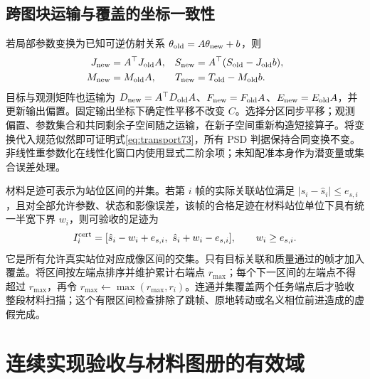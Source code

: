 \documentclass[UTF8,fontset=fandol,zihao=5,a4paper]{ctexart}
\theoremstyle{definition}
\theoremstyle{remark}\newtheorem{remark}[theorem]{说明}
\numberwithin{equation}{section}
\begin{document}
\subsection{跨图块运输与覆盖的坐标一致性}
若局部参数变换为已知可逆仿射关系 $\theta_{\rm old}=A\theta_{\rm new}+b$，则
\begin{align}
J_{\rm new}&=A^\top J_{\rm old}A,&
S_{\rm new}&=A^\top(S_{\rm old}-J_{\rm old}b),\\
M_{\rm new}&=M_{\rm old}A,&
T_{\rm new}&=T_{\rm old}-M_{\rm old}b.
\label{eq:transport73}
\end{align}
目标与观测矩阵也运输为 $D_{\rm new}=A^\top D_{\rm old}A$、$F_{\rm new}=F_{\rm old}A$、$E_{\rm new}=E_{\rm old}A$，并更新输出偏置。固定输出坐标下确定性平移不改变 $C$。选择分区同步平移；观测偏置、参数集合和共同剩余子空间随之运输，在新子空间重新构造短接算子。将变换代入规范似然即可证明式\eqref{eq:transport73}，所有 PSD 判据保持合同变换不变。非线性重参数化在线性化窗口内使用显式二阶余项；未知配准本身作为潜变量或集合误差处理。

材料足迹可表示为站位区间的并集。若第 $i$ 帧的实际关联站位满足 $|s_i-\hat s_i|\le e_{s,i}$，且对全部允许参数、状态和影像误差，该帧的合格足迹在材料站位单位下具有统一半宽下界 $w_i$，则可验收的足迹为
\begin{equation}
I_i^{\rm cert}=[\hat s_i-w_i+e_{s,i},\ \hat s_i+w_i-e_{s,i}],
\qquad w_i\ge e_{s,i}.
\label{eq:footprint73}
\end{equation}
它是所有允许真实站位对应成像区间的交集。只有目标关联和质量通过的帧才加入覆盖。将区间按左端点排序并维护累计右端点 $r_{\max}$；每个下一区间的左端点不得超过 $r_{\max}$，再令 $r_{\max}\leftarrow\max(r_{\max},r_i)$。连通并集覆盖两个任务端点后才验收整段材料扫描；这个有限区间检查排除了跳帧、原地转动或名义相位前进造成的虚假完成。


\section{连续实现验收与材料图册的有效域}
\label{sec:geometry_certificate}
\end{document}
